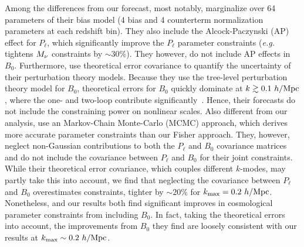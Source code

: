 Among the differences from our forecast, most notably, \cite{chudaykin2019}  
marginalize over 64 parameters of their bias model (4 bias and 4 counterterm 
normalization parameters at each redshift bin). They also include the 
Alcock-Paczynski (AP) effect for $P_\ell$, which significantly improve the 
$P_\ell$ parameter constraints (\emph{e.g.} tightens $M_\nu$ constraints by $\sim30\%$). 
They however, do not include AP effects in $B_0$. Furthermore, 
\cite{chudaykin2019} use theoretical error covariance to quantify the 
uncertainty of their perturbation theory models. Because they use the tree-level 
perturbation theory model for $B_0$, theoretical errors for $B_0$ quickly 
dominate at $k \gtrsim 0.1~h/{\rm Mpc}$, where the one- and two-loop contribute 
significantly~\citep[\emph{e.g.}][]{lazanu2018}. Hence, their forecasts do not include 
the constraining power on nonlinear scales. Also different from our analysis,
\cite{chudaykin2019} use an Markov-Chain Monte-Carlo (MCMC) 
approach, which derives more accurate parameter constraints than our Fisher
approach. They, however, neglect non-Gaussian contributions to both the 
$P_\ell$ and $B_0$ covariance matrices and do not include the covariance 
between $P_\ell$ and $B_0$ for their joint constraints. While their theoretical 
error covariance, which couples different $k$-modes, may partly take this into 
account, we find that neglecting the covariance between $P_\ell$ and $B_0$ overestimates 
constraints, tighter by ${\sim}20\%$ for $k_{\rm max} = 0.2~h/{\rm Mpc}$. 
Nonetheless, \cite{chudaykin2019} 
and our results both find significant improves in cosmological parameter 
constraints from including $B_0$. In fact, taking the theoretical errors 
into account, the improvements from $B_0$ they find are loosely consistent 
with our results at $k_{\rm max} \sim  0.2~h/{\rm Mpc}$. 

